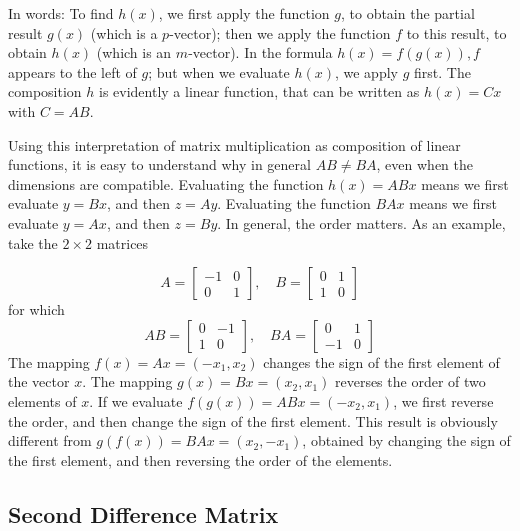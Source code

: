 In words: To find $ h(x) $, we first apply the function $ g $, to obtain the partial result $ g(x) $ (which is a $ p $-vector); then we apply the function $ f $ to this result, to obtain $ h(x) $ (which is an $ m $-vector). In the formula $ h(x)=f(g(x)), f $ appears to the left of $ g $; but when we evaluate $ h(x) $, we apply $ g $ first. The composition $ h $ is evidently a linear function, that can be written as $ h(x)=C x $ with $ C=A B $.


Using this interpretation of matrix multiplication as composition of linear functions, it is easy to understand why in general $ A B \neq B A $, even when the dimensions are compatible. Evaluating the function $ h(x)=A B x $ means we first evaluate $ y=B x $, and then $ z=A y $. Evaluating the function $ B A x $ means we first evaluate $ y=A x $, and then $ z=B y $. In general, the order matters. As an example, take the $ 2 \times 2 $ matrices

\begin{example}
    $$
A=\left[\begin{array}{rr}
-1 & 0 \\
0 & 1
\end{array}\right], \quad B=\left[\begin{array}{ll}
0 & 1 \\
1 & 0
\end{array}\right]
$$
for which
$$
A B=\left[\begin{array}{rr}
0 & -1 \\
1 & 0
\end{array}\right], \quad B A=\left[\begin{array}{rr}
0 & 1 \\
-1 & 0
\end{array}\right]
$$
The mapping $ f(x)=A x=\left(-x_{1}, x_{2}\right) $ changes the sign of the first element of the vector $ x $. The mapping $ g(x)=B x=\left(x_{2}, x_{1}\right) $ reverses the order of two elements of $ x $. If we evaluate $ f(g(x))=A B x=\left(-x_{2}, x_{1}\right) $, we first reverse the order, and then change the sign of the first element. This result is obviously different from $ g(f(x))=B A x=\left(x_{2},-x_{1}\right) $, obtained by changing the sign of the first element, and then reversing the order of the elements.
\end{example}



\subsection{Second Difference Matrix}

